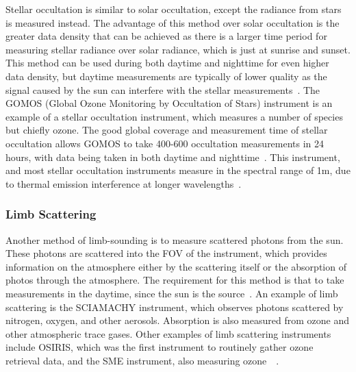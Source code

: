 Stellar occultation is similar to solar occultation, except the radiance from stars is measured instead. The advantage of this method over solar occultation is the greater data density that can be achieved as there is a larger time period for measuring stellar radiance over solar radiance, which is just at sunrise and sunset. This method can be used during both daytime and nighttime for even higher data density, but daytime measurements are typically of lower quality as the signal caused by the sun can interfere with the stellar measurements~\citep{SPARC}. The GOMOS (Global Ozone Monitoring by Occultation of Stars) instrument is an example of a stellar occultation instrument, which measures a number of species but chiefly ozone. The good global coverage and measurement time of stellar occultation allows GOMOS to take 400-600 occultation measurements in 24 hours, with data being taken in both daytime and nighttime~\citep{GOMOS_stellar_occulation}. This instrument, and most stellar occultation instruments measure in the spectral range of 1\textmu m, due to thermal emission interference at longer wavelengths~\citep{SPARC}.

\subsubsection{Limb Scattering}
Another method of limb-sounding is to measure scattered photons from the sun. These photons are scattered into the FOV of the instrument, which provides information on the atmosphere either by the scattering itself or the absorption of photos through the atmosphere. The requirement for this method is that to take measurements in the daytime, since the sun is the source~\citep{SPARC}. An example of limb scattering is the SCIAMACHY instrument, which observes photons scattered by nitrogen, oxygen, and other aerosols. Absorption is also measured from ozone and other atmospheric trace gases. Other examples of limb scattering instruments include OSIRIS, which was the first instrument to routinely gather ozone retrieval data, and the SME instrument, also measuring ozone~\citep{OSIRIS}~\citep{SME}.

